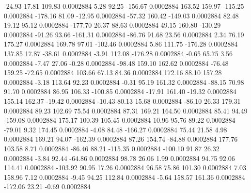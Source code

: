      -24.93       17.81      109.83     0.0002884
        5.28       92.25     -156.67     0.0002884
      163.52      159.97     -115.25     0.0002884
     -178.16       81.09      -12.95     0.0002884
      -57.32      160.42     -149.03     0.0002884
       82.48       19.12       95.12     0.0002884
     -177.70       26.37       88.63     0.0002884
       49.15      160.80     -130.29     0.0002884
      -91.26       93.66     -161.31     0.0002884
      -86.76       91.68       23.56     0.0002884
        2.34       76.19      175.27     0.0002884
      169.78       97.01     -102.46     0.0002884
        5.86      111.75     -176.28     0.0002884
      137.85       17.87      -38.61     0.0002884
       -3.91      112.08     -176.28     0.0002884
       -0.65       65.75        3.56     0.0002884
       -7.47       27.06       -0.28     0.0002884
      -98.48      159.10      162.62     0.0002884
      -76.48      159.25      -72.65     0.0002884
      103.66       67.13       84.36     0.0002884
      172.16       88.10      157.28     0.0002884
       -3.18      113.64       92.23     0.0002884
       -0.31       95.19      161.32     0.0002884
      -88.15       70.98       91.70     0.0002884
       86.95      106.33     -100.85     0.0002884
      -17.91      161.40      -19.32     0.0002884
      155.14      162.37      -19.42     0.0002884
      -10.43       80.13       15.68     0.0002884
      -86.10       26.33      179.31     0.0002884
       89.23      102.69       75.54     0.0002884
       87.31      169.21      164.50     0.0002884
       85.41       94.49     -159.08     0.0002884
      175.17      100.39      105.45     0.0002884
       10.96       95.76       89.22     0.0002884
      -79.01        9.32      174.45     0.0002884
       -4.08       84.48     -166.27     0.0002884
       75.44       21.58        4.98     0.0002884
      169.21       94.07     -162.39     0.0002884
       87.26      154.74      -84.88     0.0002884
      177.76      103.58        8.71     0.0002884
      -86.46       88.21     -115.35     0.0002884
     -100.10       91.87       26.32     0.0002884
       -3.84       92.44      -64.86     0.0002884
       98.78       26.06        1.99     0.0002884
       94.75       92.06      114.41     0.0002884
     -103.92       90.95       17.26     0.0002884
       96.58       75.86      101.30     0.0002884
        7.03      158.96        7.12     0.0002884
       -9.45       94.25      112.84     0.0002884
       -5.64      158.57      161.36     0.0002884
     -172.06       23.21       -0.69     0.0002884

